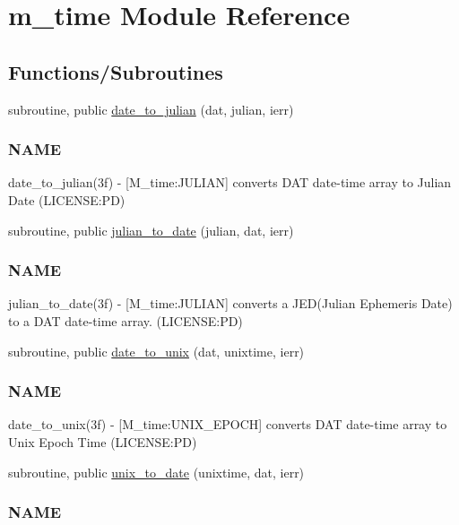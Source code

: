 \hypertarget{namespacem__time}{}\section{m\+\_\+time Module Reference}
\label{namespacem__time}
\subsection*{Functions/\+Subroutines}
\begin{DoxyCompactItemize}
\item 
subroutine, public \mbox{\hyperlink{namespacem__time_acfdc970b4154b0c15bd33727636e3992}{date\+\_\+to\+\_\+julian}} (dat, julian, ierr)
\begin{DoxyCompactList}\small\item\em \subsubsection*{N\+A\+ME}

date\+\_\+to\+\_\+julian(3f) -\/ \mbox{[}M\+\_\+time\+:J\+U\+L\+I\+AN\mbox{]} converts D\+AT date-\/time array to Julian Date (L\+I\+C\+E\+N\+SE\+:PD) \end{DoxyCompactList}\item 
subroutine, public \mbox{\hyperlink{namespacem__time_abb44cf18cd0a3e420c20469efb056203}{julian\+\_\+to\+\_\+date}} (julian, dat, ierr)
\begin{DoxyCompactList}\small\item\em \subsubsection*{N\+A\+ME}

julian\+\_\+to\+\_\+date(3f) -\/ \mbox{[}M\+\_\+time\+:J\+U\+L\+I\+AN\mbox{]} converts a J\+ED(Julian Ephemeris Date) to a D\+AT date-\/time array. (L\+I\+C\+E\+N\+SE\+:PD) \end{DoxyCompactList}\item 
subroutine, public \mbox{\hyperlink{namespacem__time_aed245c691853279ebf0ce899dec9caa9}{date\+\_\+to\+\_\+unix}} (dat, unixtime, ierr)
\begin{DoxyCompactList}\small\item\em \subsubsection*{N\+A\+ME}

date\+\_\+to\+\_\+unix(3f) -\/ \mbox{[}M\+\_\+time\+:U\+N\+I\+X\+\_\+\+E\+P\+O\+CH\mbox{]} converts D\+AT date-\/time array to Unix Epoch Time (L\+I\+C\+E\+N\+SE\+:PD) \end{DoxyCompactList}\item 
subroutine, public \mbox{\hyperlink{namespacem__time_acc62ada23f8fa2fe67b428702fbcbf1c}{unix\+\_\+to\+\_\+date}} (unixtime, dat, ierr)
\begin{DoxyCompactList}\small\item\em \subsubsection*{N\+A\+ME}


\end{DoxyCompactList}
\end{DoxyCompactItemize}
